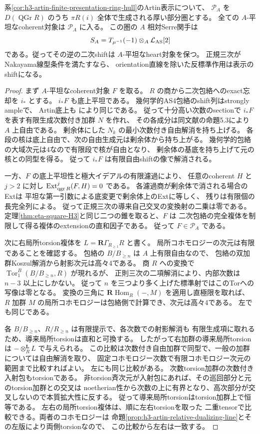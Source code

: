 \begin{theorem}\label{thm:h3-artin-relative-serre-exists}
系\ref{cor:h3-artin-finite-presentation-ring-hull}のArtin表示について、
$\mathcal P_A$ を $D(\operatorname{QGr}R)$ のうち
$\pi R(i)$ 全体で生成される厚い部分圏とする。
全ての $A$-平坦なcoherent対象は $\mathcal P_A$ に入る。
この圏の $A$ 相対Serre関手は
\[
 S_A=T_{\mu^{-1}}(-1)\otimes_A\mathcal L_{\rm AS}[2]
\]
である。従ってその逆の二次shiftは $A$-平坦なheart対象を保つ。
正規三次がNakayama線型条件を満たすなら、
orientation直線を除いた反標準作用は表示のshiftになる。
\end{theorem}
\begin{proof}
まず $A$-平坦なcoherent対象 $F$ を取る。
$R$ の商から二次包絡へのexact忘却を $i_*$ とする。
$i_*F$ も底上平坦である。
幾何学的AS4包絡のshift列はstrongly ampleで、
Artin底上も \cite[定理4.2]{VdBFormalAbelian} により同じである。
従って十分高い次数のsectionで $i_*F$ を表す有限生成次数付き加群 $N$ を作れ、
その各成分は同文献の命題5.3により $A$ 上自由である。
剰余体にした $N_k$ の最小次数付き自由解消を持ち上げる。
各段の核は底上自由で、次の自由生成元は剰余体から持ち上がる。
幾何学的包絡の大域次元は4なので有限段で核が自由となり、
剰余体の基底を持ち上げて元の核との同型を得る。
従って $i_*F$ は有限自由shiftの像で解消される。

一方、$F$ の底上平坦性と極大イデアルの有限濾過により、
任意のcoherent $H$ と $j>2$ に対し $\operatorname{Ext}^{j}_{\operatorname{qgr} R}(F,H)=0$ である。
各濾過商が剰余体で消される場合のExtは
平坦な第一引数による底変更で剰余体上のExtに等しく、
残りは有限個の長完全列による。
従って正規三次の導来自己交叉の変換射の二乗は零である。
定理\ref{thm:eta-square-H3}と同じ二つの錐を取ると、$F$ は
二次包絡の完全複体を制限して得る複体のextensionの直和因子である。
従って $F\in\mathcal P_A$ である。

次に右局所torsion複体を $L=\mathbf R\Gamma_{R_{\ge1}}R$ と書く。
局所コホモロジーの次元は有限であることを確認する。
包絡の $B/B_{\ge n}$ は $A$ 上有限自由なので、
包絡の双加群Koszul解消から射影次元は高々4である。
商 $R$ への変換で $\operatorname{Tor}_1^B(B/B_{\ge n},R)$ が現れるが、
正則三次の二項解消により、内部次数は $n-3$ 以上にしかない。
従って $n$ を三つより多く上げた標準射ではこのTorへの写像は零となる。
変換の三角に $\mathbf R\operatorname{Hom}_R(-,M)$ を適用し直極限を取れば、
$R$ 加群 $M$ の局所コホモロジーは包絡側で計算でき、次元は高々4である。
左でも同じである。

各 $B/B_{\ge n}$、$R/R_{\ge n}$ は有限提示で、各次数での射影解消も
有限生成項に取れるため、導来局所torsionは直和と可換する。
したがって右加群の導来局所torsionは $-\otimes_R^{\mathbf L}L$ で与えられる。
この比較は次数付き自由加群で同型で、一般の加群については自由解消を取り、
固定コホモロジー次数で有限コホモロジー次元の範囲まで比較すればよい。
左にも同じ比較がある。
次数torsion加群の次数付き入射包もtorsionである。
非torsion斉次元が入射包にあれば、その巡回部分と元のtorsion加群との交叉は
noetherian性から次数の上に有界となり、高次部分が交叉しないので本質拡大性に反する。
従って導来局所torsionはtorsion加群上で恒等である。
左右の局所torsion複体は、順に左右torsionを取った
二重tensorで比較できる。両者のコホモロジーは
命題\ref{prop:h3-artin-relative-dualizing-line}とその左版により両側torsionなので、
この比較から左右は一致する。


\end{proof}
